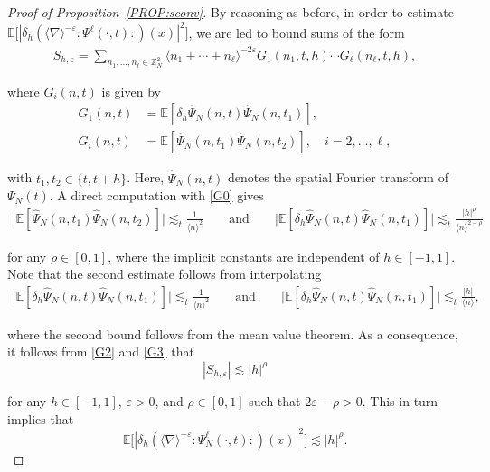 \documentclass[letterpaper, 11pt,  reqno]{amsart}
\newcommand{\1}{\hspace{0.5mm}\text{I}\hspace{0.5mm}}
\newcommand{\noi}{\noindent}
\newcommand{\E}{\mathbb{E}}
\newcommand{\dl}{\delta}
\newcommand{\nb}{\nabla}
\newcommand{\eps}{\varepsilon}
\newcommand{\ft}{\widehat}
\renewcommand{\l}{\ell}
\newcommand{\les}{\lesssim}
\newcommand{\jb}[1]
{\langle #1 \rangle}
\numberwithin{equation}{section}
\numberwithin{theorem}{section}
\newcommand{\hiro}[1]{\marginpar{\color{red} $\Leftarrow\Leftarrow\Leftarrow$}{\smallskip \noi\color{blue}HIRO: #1}\smallskip}
\begin{document}
\begin{proof}[Proof of Proposition~\ref{PROP:sconv}]
%



\noi
By reasoning as before, in order to estimate 
$\mathbb{E} \big[|\dl_h (\jb{\nb}^{-\eps} : \! \Psi^{\ell} (\cdot, t ) \!:) (x) |^2 \big]$,
we are led to bound
sums of the form
\begin{align}
 S_{h, \eps} = \sum_{n_1, \ldots, n_{\ell} \in \mathbb{Z}^2_N} \langle n_1 + \cdots +
   n_{\ell}\rangle^{-2\eps} G_1 (n_1, t, h) \cdots G_{\ell} (n_{\ell}, t, h),  
\label{G2}
\end{align}


\noi
where $G_i(n, t)$ is given by 
\begin{align*}
G_1 (n, t) & =\E [\dl_h \ft \Psi_N (n, t)  \ft{\Psi}_N ( n, t_1)], \\
G_i (n, t) & =\E [\ft \Psi_N (n, t_1) \ft \Psi_N (n, t_2)], \quad i = 2, \dots, \l, 
\end{align*}


\noi
with $t_1, t_2 \in \{t, t+h\}$.
Here, $\ft \Psi_N (n, t)$ denotes the spatial Fourier transform of $\Psi_N(t)$.  
A direct computation with \eqref{G0} gives 
\begin{align} 
\big| \E [\ft \Psi_N (n, t_1) \ft \Psi_N (n, t_2)] \big| 
\les_t \frac{1}{\jb{n}^2}
\qquad \text{and}\qquad 
\big| \E [\dl_h \ft \Psi_N (n, t) \ft {\Psi}_N (n, t_1)] \big| 
\les_t \frac{|h|^{\rho}}{\jb{n}^{2 -\rho}} 
\label{G3}
\end{align}
   
   
\noi   
for any $\rho \in [0, 1]$,
where the implicit constants are independent of  $h \in [-1, 1]$.
Note that the second estimate follows
from interpolating 
\begin{align*} 
\big| \E [\dl_h \ft \Psi_N (n, t) \ft {\Psi}_N (n, t_1)] \big| 
\les_t \frac{1}{\jb{n}^2}
\qquad \text{and}
\qquad 
\big| \E [\dl_h \ft \Psi_N (n, t) \ft {\Psi}_N (n, t_1)] \big| 
\les_t \frac{|h|}{\jb{n}}, 
\end{align*}

\noi
where the second bound follows from the mean value theorem.
As a consequence, it follows from \eqref{G2} and \eqref{G3} that 
\[ | S_{h, \eps} | \les  |h|^\rho \]


\noi
for any $h \in [-1,1]$, $\eps > 0$,  and  $\rho \in [0, 1]$ such that $2 \eps -\rho >0$. 
This in turn implies that
\[ \E \big[| \dl_h ( \jb{\nb}^{-\eps} : \!\Psi^{\l}_N (\cdot, t) \!:) (x) |^2 \big]
   \les  |h|^{\rho}. \]



\end{proof}
\end{document}
